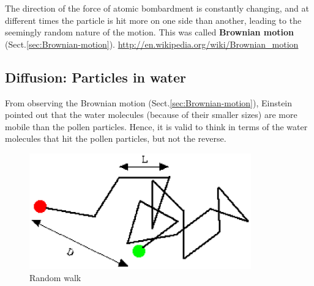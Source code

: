 The direction of the force of atomic bombardment is constantly changing, and at
different times the particle is hit more on one side than another, leading to
the seemingly random nature of the motion. This was called {\bf Brownian motion}
(Sect.\ref{sec:Brownian-motion}).
\url{http://en.wikipedia.org/wiki/Brownian_motion}


\subsection{Diffusion: Particles in water}
\label{sec:diffusion-particles}


From observing the Brownian motion (Sect.\ref{sec:Brownian-motion}), Einstein
pointed out that the water molecules (because of their smaller sizes) are more
mobile than the pollen particles. Hence, it is valid to think in terms of the
water molecules that hit the pollen particles, but not the reverse.

\begin{figure}[hbt]
  \centerline{\includegraphics[height=5cm,
    angle=0]{./images/random_walk.eps}}
\caption{Random walk}
\label{fig:random_walk}
\end{figure}

